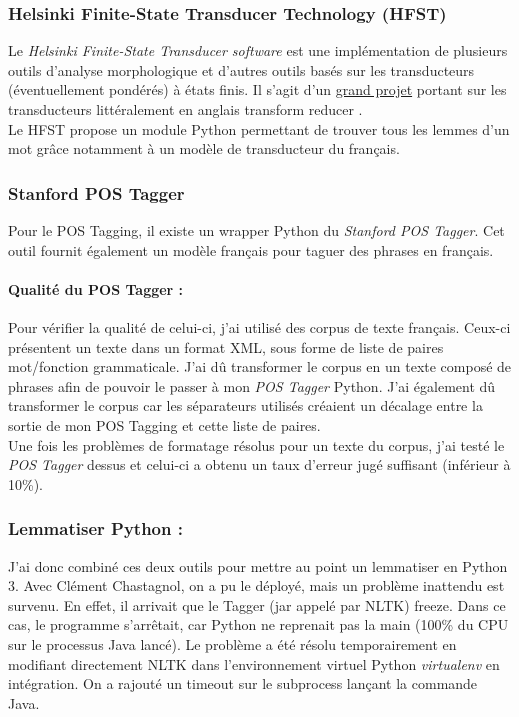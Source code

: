         \subsubsection{Helsinki Finite-State Transducer Technology (HFST)}
            Le \textit{Helsinki Finite-State Transducer software} est une implémentation de plusieurs outils d'analyse morphologique et d'autres outils basés sur les transducteurs (éventuellement pondérés) à états finis. Il s'agit d'un \href{http://www.ling.helsinki.fi/kieliteknologia/tutkimus/hfst/}{grand projet} portant sur les transducteurs littéralement en anglais \og transform reducer \fg.\\
            Le HFST propose un module Python permettant de trouver tous les lemmes d'un mot grâce notamment à un modèle de transducteur du français.

        \subsubsection{Stanford POS Tagger}
            Pour le POS Tagging, il existe un wrapper Python du \textit{Stanford POS Tagger}. Cet outil fournit également un modèle français pour taguer des phrases en français.

            \paragraph{Qualité du POS Tagger :}
                Pour vérifier la qualité de celui-ci, j'ai utilisé des corpus de texte français. Ceux-ci présentent un texte dans un format XML, sous forme de liste de paires mot/fonction grammaticale. J'ai dû transformer le corpus en un texte composé de phrases afin de pouvoir le passer à mon \textit{POS Tagger} Python. J'ai également dû transformer le corpus car les séparateurs utilisés créaient un décalage entre la sortie de mon POS Tagging et cette liste de paires.\\
                Une fois les problèmes de formatage résolus pour un texte du corpus, j'ai testé le \textit{POS Tagger} dessus et celui-ci a obtenu un taux d'erreur jugé suffisant (inférieur à 10\%).

        \subsubsection{Lemmatiser Python :}
            J'ai donc combiné ces deux outils pour mettre au point un lemmatiser en Python 3. Avec Clément Chastagnol, on a pu le déployé, mais un problème inattendu est survenu. En effet, il arrivait que le Tagger (jar appelé par NLTK) freeze. Dans ce cas, le programme s'arrêtait, car Python ne reprenait pas la main (100\% du CPU sur le processus Java lancé). Le problème a été résolu temporairement en modifiant directement NLTK dans l'environnement virtuel Python \textit{virtualenv} en intégration. On a rajouté un timeout sur le subprocess lançant la commande Java.\\

